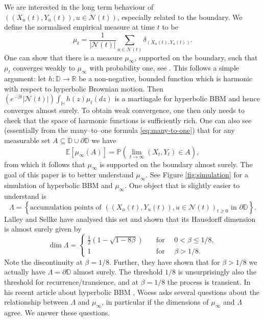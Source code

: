 \documentclass{article}
\theoremstyle{definition}
\numberwithin{equation}{section}
\numberwithin{thm}{section}
\newcommand*{\RR}{\ensuremath{\mathbb{R}}}	        	%
\newcommand*{\EE}{\ensuremath{\mathbb{E}}}	        	%
\newcommand*{\PP}{\ensuremath{\mathbb{P}}}	        	%
\newcommand*{\DD}{\ensuremath{\mathbb{D}}}	        	%
\newcommand*{\HH}{\ensuremath{\mathbb{H}}}	        	%
\begin{document}
We are interested in the long term behaviour of $((X_u(t),Y_u(t)),u\in \mathcal{N}(t) )$, especially related to the boundary. We define the normalised empirical measure at time $t$ to be
\begin{equation*}
    \mu_t = \frac{1}{\vert \mathcal N (t)\vert}\sum_{u \in \mathcal{N}(t)}\delta_{(X_u(t),Y_u(t))}.
\end{equation*}
One can show that there is a measure $\mu_\infty$, supported on the boundary, such that $\mu_t$ converges weakly to $\mu_\infty$ with probability one, see \cite{woess_notes_2024}. 
This follows a simple argument: let $h:\DD \to\RR$ be a non-negative, bounded function which is harmonic with respect to hyperbolic Brownian motion. Then {$(e^{-\beta t}\vert\mathcal{N}(t)\vert)\int_\HH h(z)\mu_t(dz)$} is a martingale for hyperbolic BBM and hence converges almost surely. To obtain weak convergence, one then only needs to check that the space of harmonic functions is sufficiently rich. One can also see (essentially from the many--to--one formula \eqref{eq:many-to-one}) that for any measurable set $A \subseteq \DD \cup \partial \DD$ we have
\begin{equation*}
    \EE\left[ \mu_\infty(A)\right] = \PP \left(\lim_{t \to \infty} (X_t, Y_t)\in A \right),
\end{equation*}
from which it follows that $\mu_\infty$ is supported on the boundary almost surely. The goal of this paper is to better understand $\mu_\infty$. See Figure \ref{fig:simulation} for a simulation of hyperbolic BBM and $\mu_\infty$. One object that is slightly easier to understand is 
\begin{equation*}
    \Lambda = \left\{ \text{accumulation points of } ((X_u(t),Y_u(t)),u\in \mathcal{N}(t) )_{t \geq 0} \text{ in }\partial \DD\right\}.
\end{equation*}
Lalley and Sellke \cite{lalley_hyperbolic_1997} have analysed this set and shown that {its} Hausdorff dimension is almost surely given by
\begin{equation*}
    \dim \Lambda = \begin{cases}
        \frac{1}{2}(1-\sqrt{1- 8\beta}) \quad &\text{for } \quad 0<\beta \leq 1/8, \\
        1 & \text{for } \quad \beta>1/8.
    \end{cases}
\end{equation*}
Note the discontinuity at $\beta =1/8$.
Further, they have shown that for $\beta>1/8$ we actually have $\Lambda =\partial \DD$ almost surely. The threshold $1/8$ is unsurprisingly also the threshold for recurrence/transience, and at $\beta=1/8$ the process is transient. In his recent article about hyperbolic BBM \cite{woess_notes_2024}, Woess asks several questions about the relationship between $\Lambda$ and $\mu_\infty$, in particular if the dimensions of $\mu_\infty$ and $\Lambda$ agree. We answer these questions.
\end{document}
